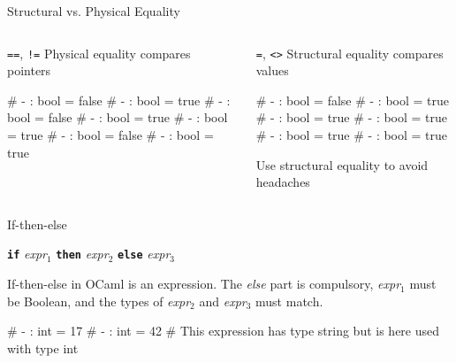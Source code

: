\documentclass{plt}
\begin{document}
\begin{frame}[fragile]{Structural vs. Physical Equality}

\begin{columns}
\begin{column}[t]{0.5\textwidth}      
\verb|==|, \verb|!=| Physical equality compares pointers

\begin{interactive}
# 
- : bool = false
\li
# 
- : bool = true
\li
# 
- : bool = false   
\li
# 
- : bool = true
\li
# 
- : bool = true 
\li
# 
- : bool = false   
\li
# 
- : bool = true
\end{interactive}
\end{column}%
\begin{column}[t]{0.5\textwidth}
\verb|=|, \verb|<>| Structural equality compares values
  
\begin{interactive}
# 
- : bool = false
\li
# 
- : bool = true
\li
# 
- : bool = true    
\li
# 
- : bool = true
\li
# 
- : bool = true
\li
# 
- : bool = true
\end{interactive}
Use structural equality to avoid headaches
\end{column}
\end{columns}

\end{frame}

\begin{frame}[fragile]{If-then-else}

  \begin{center}
  \textbf{\texttt{if}} \emph{expr}$_1$ \textbf{\texttt{then}}
  \emph{expr}$_2$ \textbf{\texttt{else}} \emph{expr}$_3$
  \end{center}

  If-then-else in OCaml is an expression.  The \emph{else} part is
  compulsory, \emph{expr}$_1$ must be Boolean, and the types of
  \emph{expr}$_2$ and \emph{expr}$_3$ must match.

\begin{interactive}
# 
- : int = 17
\li
# 
- : int = 42
\li
# 
This expression has type string but is here used with type int
\end{interactive}

\end{frame}
\end{document}
